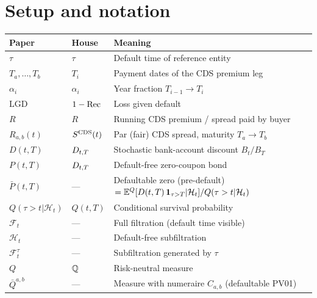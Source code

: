 \documentclass[11pt,a4paper]{article}
\begin{document}
\section{Setup and notation}

\begin{tabular}{@{}p{3cm}p{3.5cm}p{8.5cm}@{}}
\toprule
Paper                       & House                          & Meaning \\
\midrule
$\tau$                      & $\tau$                         & Default time of reference entity \\
$T_a, \ldots, T_b$          & $T_i$                          & Payment dates of the CDS premium leg \\
$\alpha_i$                  & $\alpha_i$                     & Year fraction $T_{i-1} \to T_i$ \\
$\mathrm{LGD}$              & $1 - \mathrm{Rec}$                     & Loss given default \\
$R$                         & $R$                            & Running CDS premium / spread paid by buyer \\
$R_{a,b}(t)$                & $S^{\mathrm{CDS}}(t)$                     & Par (fair) CDS spread, maturity $T_a \to T_b$ \\
$D(t, T)$                   & $D_{t,T}$                  & Stochastic bank-account discount $B_t / B_T$ \\
$P(t, T)$                   & $D_{t,T}$                  & Default-free zero-coupon bond \\
$\bar P(t, T)$              & ---                            & Defaultable zero (pre-default) $= \mathbb{E}^Q[D(t,T)\,\mathbf{1}_{\tau > T} | \mathcal{H}_t]/Q(\tau > t|\mathcal{H}_t)$ \\
$Q(\tau > t | \mathcal{H}_t)$ & $Q(t, T)$                    & Conditional survival probability \\
$\mathcal{F}_t$             & ---                            & Full filtration (default time visible) \\
$\mathcal{H}_t$             & ---                            & Default-free subfiltration \\
$\mathcal{F}^\tau_t$        & ---                            & Subfiltration generated by $\tau$ \\
$Q$                         & $\mathbb{Q}$                           & Risk-neutral measure \\
$\bar Q^{a,b}$              & ---                            & Measure with numeraire $C_{a,b}$ (defaultable PV01) \\

\end{tabular}
\end{document}
